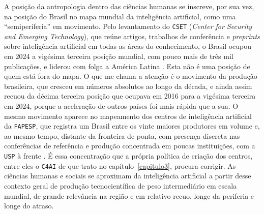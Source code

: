A posição da antropologia dentro das ciências humanas se inscreve, por sua vez, na posição do Brasil no mapa mundial da inteligência artificial, como uma \enquote{semiperiferia} em movimento. Pelo levantamento do \texttt{CSET} (\emph{Center for Security and Emerging Technology}), que reúne artigos, trabalhos de conferência e \emph{preprints} sobre inteligência artificial em todas as áreas do conhecimento, o Brasil ocupou em 2024 a vigésima terceira posição mundial, com pouco mais de três mil publicações, e liderou com folga a América Latina \parencite{OWID2024AI}. Esta não é uma posição de quem está fora do mapa. O que me chama a atenção é o movimento da produção brasileira, que cresceu em números absolutos ao longo da década, e ainda assim recuou da décima terceira posição que ocupava em 2016 para a vigésima terceira em 2024, porque a aceleração de outros países foi mais rápida que a sua. O mesmo movimento aparece no mapeamento dos centros de inteligência artificial da \texttt{FAPESP}, que registra um Brasil entre os vinte maiores produtores em volume e, ao mesmo tempo, distante da fronteira de ponta, com presença discreta nas conferências de referência e produção concentrada em poucas instituições, com a \texttt{USP} à frente \parencite{Brandao2024Desenvolvimento}. É essa concentração que a própria política de criação dos centros, entre eles o \texttt{C4AI} de que trato no capítulo~\ref{capitulo3}, procura corrigir. As ciências humanas e sociais se aproximam da inteligência artificial a partir desse contexto geral de produção tecnocientífica de peso intermediário em escala mundial, de grande relevância na região e em relativo recuo, longe da periferia e longe do atraso.

